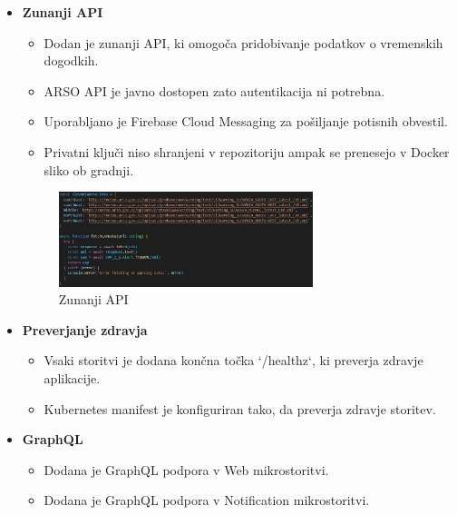 \documentclass[a4paper,11pt]{article}
\begin{document}
\begin{itemize}
	\item \textbf{Zunanji API}
	      \begin{itemize}
	      	\item Dodan je zunanji API, ki omogoča pridobivanje podatkov o vremenskih dogodkih.
	      	\item ARSO API je javno dostopen zato autentikacija ni potrebna.
	      	\item Uporabljano je Firebase Cloud Messaging za po\v{s}iljanje potisnih obvestil.
	      	\item Privatni ključi niso shranjeni v repozitoriju ampak se prenesejo v Docker sliko ob gradnji.
	      \end{itemize}
	      
	      \begin{figure}[h!]
	      	\centering
	      	\includegraphics[width=0.7\textwidth]{images/arsoapi.png}
	      	\caption{Zunanji API}
	      	\label{fig:api}
	      \end{figure}
	      
	\item \textbf{Preverjanje zdravja}
	      \begin{itemize}
	      	\item Vsaki storitvi je dodana končna točka `/healthz`, ki preverja zdravje aplikacije.
	      	\item Kubernetes manifest je konfiguriran tako, da preverja zdravje storitev.
	      \end{itemize}
	\item \textbf{GraphQL}
	      \begin{itemize}
	      	\item Dodana je GraphQL podpora v Web mikrostoritvi.
	      	\item Dodana je GraphQL podpora v Notification mikrostoritvi.
	      \end{itemize}
	      

\end{itemize}
\end{document}
